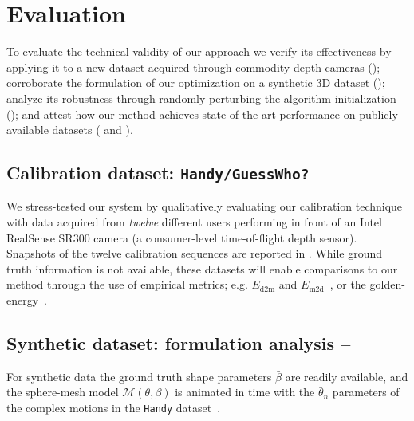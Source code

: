 \section{Evaluation} \label{honline-eval}
To evaluate the technical validity of our approach we verify its effectiveness by applying it to a new dataset acquired through commodity depth cameras (); corroborate the formulation of our optimization on a synthetic 3D dataset (); analyze its robustness through randomly perturbing the algorithm initialization (); and attest how our method achieves state-of-the-art performance on publicly available datasets ( and ).

\subsection{Calibration dataset: \texttt{Handy/GuessWho?} -- }
\label{sec:evaldataset}
We stress-tested our system by qualitatively evaluating our calibration technique with data acquired from \emph{twelve} different users performing in front of an Intel RealSense SR300 camera (a consumer-level time-of-flight depth sensor). Snapshots of the twelve calibration sequences are reported in .
While ground truth information is not available, these datasets will enable comparisons to our method through the use of empirical metrics; e.g. $E_\text{d2m}$ and $E_\text{m2d}$~\cite{tkach2016sphere}, or the golden-energy~\cite{taylor2016joint}.

\subsection{Synthetic dataset: formulation analysis -- }
\label{sec:analysis}
For synthetic data the ground truth shape parameters $\bar\beta$ are readily available, and the sphere-mesh model $\mathcal{M}(\theta,\beta)$ is animated in time with the $\bar\theta_n$ parameters of the complex motions in the \texttt{Handy} dataset~\cite{tkach2016sphere}.

